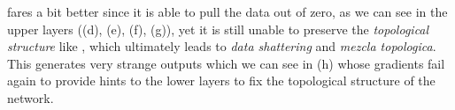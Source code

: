 \begin{figure}
{{    %
    }
    \parbox{.195\textwidth}{%
    }
  }
  \caption{\ReLUBN}
    \label{fig:moonsReLUBN}
\end{figure}

\ReLUBN fares a bit better since it is able to pull the data out of zero, as we can see in the upper layers ((d), (e), (f), (g)), yet it is still unable to preserve the \emph{topological structure} like \ReLU, which ultimately leads to \emph{data shattering} \cite{dataShattering} and \emph{mezcla topologica}. This generates very strange outputs which we can see in (h) whose gradients fail again to provide hints to the lower layers to fix the topological structure of the network. 

